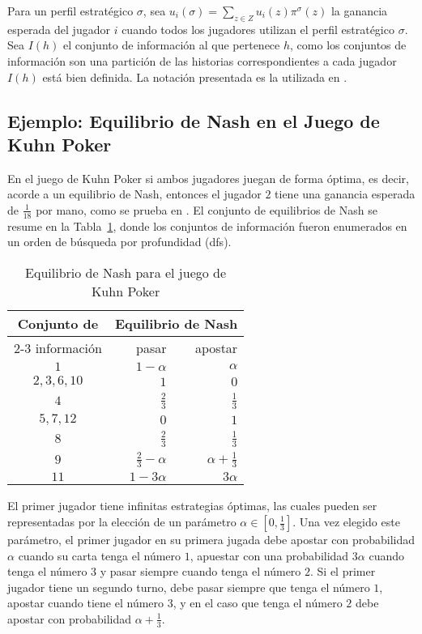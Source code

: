 Para un perfil estratégico $\sigma$, sea $u_i(\sigma) = \sum_{z \in Z} u_i(z)\pi^{\sigma}(z)$ la ganancia esperada del jugador $i$ cuando todos los jugadores utilizan el perfil estratégico $\sigma$. Sea $I(h)$ el conjunto de información al que pertenece $h$, como los conjuntos de información son una partición de las historias correspondientes a cada jugador $I(h)$ está bien definida. La notación presentada es la utilizada en \cite{bib:cfr}.

\subsection*{Ejemplo: Equilibrio de Nash en el Juego de Kuhn Poker}

En el juego de Kuhn Poker si ambos jugadores juegan de forma óptima, es decir, acorde a un equilibrio de Nash, entonces el jugador $2$ tiene una ganancia esperada de $\frac{1}{18}$ por mano, como se prueba en \cite{bib:kuhn-poker}. El conjunto de equilibrios de Nash se resume en la Tabla~\ref{tab:estrategia-kuhn-poker}, donde los conjuntos de información fueron enumerados en un orden de búsqueda por profundidad (dfs).

\begin{table}[h]
\begin{center}
    \caption{Equilibrio de Nash para el juego de Kuhn Poker}
    \label{tab:estrategia-kuhn-poker}
    \begin{tabular}{c r r}
        \hline
        \multirow{2}{*}{Conjunto de} & \multicolumn{2}{c}{Equilibrio de Nash}  \\ \cmidrule{2-3}
        información & pasar & apostar \\ 
        \midrule
         $1$ & $1-\alpha$ & $\alpha$ \\
         $2, 3, 6, 10$ & $1$ & $0$ \\
         $4$ & $\frac{2}{3}$ & $\frac{1}{3}$ \\
         $5, 7, 12$ & $0$ & $1$ \\
         $8$ & $\frac{2}{3}$ & $\frac{1}{3}$ \\
         $9$ & $\frac{2}{3} - \alpha$ & $\alpha + \frac{1}{3}$ \\
        $11$ & $1 - 3 \alpha$ & $3 \alpha$ \\ \hline
    \end{tabular}
\end{center}
\end{table}

El primer jugador tiene infinitas estrategias óptimas, las cuales pueden ser representadas por la elección de un parámetro $\alpha \in \left[ 0, \frac{1}{3} \right]$. Una vez elegido este parámetro, el primer jugador en su primera jugada debe apostar con probabilidad $\alpha$ cuando su carta tenga el número $1$, apuestar con una probabilidad $3 \alpha$ cuando tenga el número $3$ y pasar siempre cuando tenga el número $2$. Si el primer jugador tiene un segundo turno, debe pasar siempre que tenga el número $1$, apostar cuando tiene el número $3$, y en el caso que tenga el número $2$ debe apostar con probabilidad $\alpha + \frac{1}{3}$.

